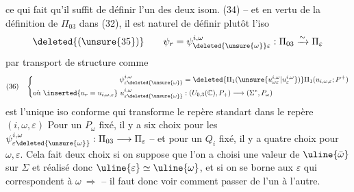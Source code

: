 ce qui fait qu'il suffit de définir l'un des deux isom. (34) -- et en vertu de la définition de $\Pi_{03}$ dans (32), il est naturel de définir plutôt l'iso
\[
\deleted{(\unsure{35})}\qquad\psi_r=\psi_{\deleted{\unsure{\omega}}\varepsilon}^{i,\omega}:\Pi_{03}\xrightarrow{\sim}\Pi_\varepsilon
\]
par transport de structure comme
\[
(36)\quad\left\{\begin{aligned}
\psi_{\varepsilon\deleted{\unsure{\omega}}}^{i,\omega}&=\deleted{\Pi_1(\unsure{u_{\omega\varepsilon}^{i,\omega}|u_\varepsilon^{i,\omega}})}\Pi_1(u_{i,\omega,\varepsilon};P^+)\\
\text{où }\inserted{u_r=u_{i,\omega,\varepsilon}}\ u_{\varepsilon\deleted{\unsure{\omega}}}^{i,\omega}&:(U_{0,3}(\mathbb C),P_+)\longrightarrow(\Sigma^*,P_\omega)
\end{aligned}\right.
\]
est l'unique iso conforme qui transforme le repère  standart   dans le repère  $(i,\omega,\varepsilon)$
Pour un $P_\omega$ fixé, il y a six choix pour les  $\psi_{\varepsilon\deleted{\unsure{\omega}}}^{i,\omega}:\Pi_{03}\longrightarrow\Pi_\varepsilon$ -- et pour un $Q_i$ fixé, il y a quatre choix pour $\omega,\varepsilon$. Cela fait  deux choix si on suppose que l'on a choisi une valeur de $\uline{\bar\omega}$ sur $\Sigma$ et réalisé donc $\uline{\varepsilon}\simeq\uline{\omega}$, et si on se borne aux $\varepsilon$ qui correspondent à $\omega\ \Rightarrow$ -- il faut donc voir comment passer de l'un  à l'autre.

